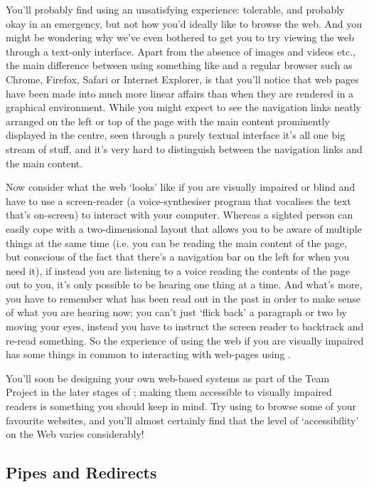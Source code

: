 You'll probably find using  an unsatisfying experience: tolerable, and probably okay in an emergency, but not how you'd ideally like to browse the web. And you might be wondering why we've even bothered to get you to try viewing the web through a text-only interface. Apart from the absence of images and videos etc., the main difference between using something like  and a regular browser such as Chrome, Firefox, Safari or Internet Explorer, is that you'll notice that web pages have been made into much more linear affairs than when they are rendered in a graphical environment. While you might expect to see the navigation links neatly arranged on the left or top of the page with the main content prominently displayed in the centre, seen through a purely textual interface it's all one big stream of stuff, and it's very hard to distinguish between the navigation links and the main content.

Now consider what the web `looks' like if you are visually impaired or blind and have to use a screen-reader (a voice-synthesiser program that vocalises the text that's on-screen) to interact with your computer. Whereas a sighted person can easily cope with a two-dimensional layout that allows you to be aware of multiple things at the same time (i.e. you can be reading the main content of the page, but conscious of the fact that there's a navigation bar on the left for when you need it), if instead you are listening to a voice reading the contents of the page out to you, it's only possible to be hearing one thing at a time. And what's more, you have to remember what has been read out in the past in order to make sense of what you are hearing now; you can't just `flick back' a paragraph or two by moving your eyes, instead you have to instruct the screen reader to backtrack and re-read something. So the experience of using the web if you are visually impaired has some things in common to interacting with web-pages using .

You'll soon be designing your own web-based systems as part of the Team Project in the later stages of ; making them accessible to visually impaired readers is something you should keep in mind. Try using  to browse some of your favourite websites, and you'll almost certainly find that the level of `accessibility' on the Web varies considerably!

\subsection{Pipes and Redirects}
\label{section:pipesandredirects}

